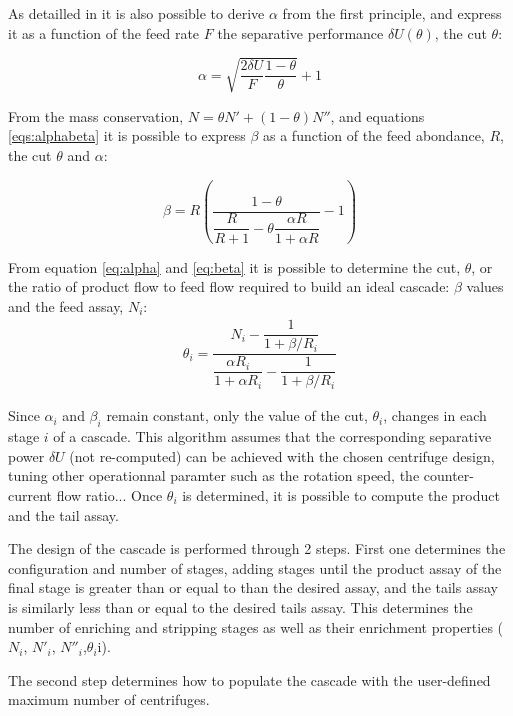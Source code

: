 As detailled in \cite{avery} it is also possible to derive $\alpha$ from the
first principle, and express it as a function of the feed rate $F$ the separative performance $\delta
U(\theta)$, the cut $\theta$:

    \begin{equation} \label{eq:alpha}
    \alpha = \sqrt{\frac{2\delta U}{F} \frac{1-\theta}{\theta}}+1
\end{equation}

From the mass conservation, $N = \theta N' + (1-\theta)N''$, and equations \eqref{eqs:alphabeta} it is
possible to express $\beta$ as a function of the feed abondance, $R$, the cut
$\theta$ and $\alpha$:

\begin{equation}\label{eq:beta}
    \beta =   R \left(\dfrac{1-\theta}
                     {\dfrac{R}{R+1}- \theta \dfrac{\alpha R}{1+\alpha R}} -1\right)
\end{equation}


From equation \eqref{eq:alpha} and \eqref{eq:beta} it is possible to determine
the cut, $\theta$, or the ratio of product flow to feed flow required to build an ideal
cascade:
$\beta$ values and the feed assay, $N_{i}$:
\begin{eqnarray}
    \theta_{i} = \dfrac{N_{i} - \dfrac{1}{1 + \beta/R_{i}}}{ \dfrac{\alpha R_{i}}{1 + \alpha R_{i}} -
           \dfrac{1}{1 + \beta/R_{i}}}
\end{eqnarray}

Since $\alpha_{i}$ and $\beta_{i}$ remain constant, only the value of the cut,
$\theta_{i}$, changes in each stage $i$ of a cascade.  This algorithm assumes
that the corresponding separative power $\delta U$ (not re-computed) can be
achieved with the chosen centrifuge design, tuning other operationnal paramter
such as the rotation speed, the counter-current flow ratio...  Once $\theta_{i}$
is determined, it is possible to compute the product and the tail assay.

The design of the cascade is performed through 2 steps.  First one determines the
configuration and number of stages, adding stages until the product assay of the
final stage is greater than or equal to than the desired assay, and the tails
assay is similarly less than or equal to the desired tails assay.  This
determines the number of enriching and stripping stages as well as their
enrichment properties ($N_{i}$, $N'_{i}$, $N''_{i}$,$\theta_{i}$i).


The second step determines how to populate the cascade with the user-defined
maximum number of centrifuges.  

